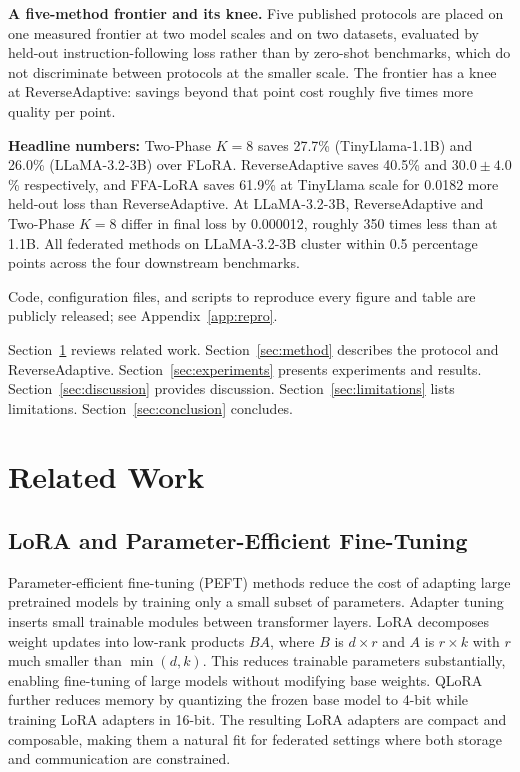 \textbf{A five-method frontier and its knee.}
Five published protocols are placed on one measured frontier at two model scales and on two datasets, evaluated by held-out instruction-following loss rather than by zero-shot benchmarks, which do not discriminate between protocols at the smaller scale. The frontier has a knee at ReverseAdaptive: savings beyond that point cost roughly five times more quality per point.

\textbf{Headline numbers:}
Two-Phase $K{=}8$ saves 27.7\% (TinyLlama-1.1B) and 26.0\% (LLaMA-3.2-3B) over FLoRA. ReverseAdaptive saves 40.5\% and $30.0 \pm 4.0$\% respectively, and FFA-LoRA saves 61.9\% at TinyLlama scale for 0.0182 more held-out loss than ReverseAdaptive. At LLaMA-3.2-3B, ReverseAdaptive and Two-Phase $K{=}8$ differ in final loss by 0.000012, roughly 350 times less than at 1.1B. All federated methods on LLaMA-3.2-3B cluster within 0.5 percentage points across the four downstream benchmarks.

Code, configuration files, and scripts to reproduce every figure and table are publicly released; see Appendix~\ref{app:repro}.

Section~\ref{sec:related} reviews related work. Section~\ref{sec:method} describes the protocol and ReverseAdaptive. Section~\ref{sec:experiments} presents experiments and results. Section~\ref{sec:discussion} provides discussion. Section~\ref{sec:limitations} lists limitations. Section~\ref{sec:conclusion} concludes.

\section{Related Work}
\label{sec:related}

\subsection{LoRA and Parameter-Efficient Fine-Tuning}
Parameter-efficient fine-tuning (PEFT) methods reduce the cost of adapting large pretrained models by training only a small subset of parameters. Adapter tuning \citep{houlsby2019parameter} inserts small trainable modules between transformer layers. LoRA \citep{hu2022lora} decomposes weight updates into low-rank products $BA$, where $B$ is $d \times r$ and $A$ is $r \times k$ with $r$ much smaller than $\min(d,k)$. This reduces trainable parameters substantially, enabling fine-tuning of large models without modifying base weights. QLoRA \citep{dettmers2023qlora} further reduces memory by quantizing the frozen base model to 4-bit while training LoRA adapters in 16-bit. The resulting LoRA adapters are compact and composable, making them a natural fit for federated settings where both storage and communication are constrained.


